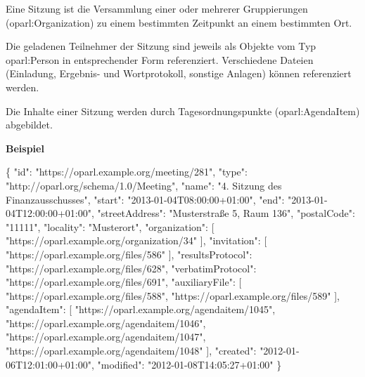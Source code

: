 \documentclass[,a4paper]{article}
\newenvironment{Shaded}{}{}
\newcommand{\DataTypeTok}[1]{\textcolor[rgb]{0.56,0.13,0.00}{{#1}}}
\newcommand{\StringTok}[1]{\textcolor[rgb]{0.25,0.44,0.63}{{#1}}}
\newcommand{\OtherTok}[1]{\textcolor[rgb]{0.00,0.44,0.13}{{#1}}}
\newcommand{\FunctionTok}[1]{\textcolor[rgb]{0.02,0.16,0.49}{{#1}}}
\begin{document}
Eine Sitzung ist die Versammlung einer oder mehrerer Gruppierungen
(oparl:Organization) zu einem bestimmten Zeitpunkt an einem bestimmten
Ort.

Die geladenen Teilnehmer der Sitzung sind jeweils als Objekte vom Typ
oparl:Person in entsprechender Form referenziert. Verschiedene Dateien
(Einladung, Ergebnis- und Wortprotokoll, sonstige Anlagen) können
referenziert werden.

Die Inhalte einer Sitzung werden durch Tagesordnungspunkte
(oparl:AgendaItem) abgebildet.

\textbf{Beispiel}

\begin{Shaded}
\begin{Highlighting}[]
\FunctionTok{\{}
    \DataTypeTok{"id"}\FunctionTok{:} \StringTok{"https://oparl.example.org/meeting/281"}\FunctionTok{,}
    \DataTypeTok{"type"}\FunctionTok{:} \StringTok{"http://oparl.org/schema/1.0/Meeting"}\FunctionTok{,}
    \DataTypeTok{"name"}\FunctionTok{:} \StringTok{"4. Sitzung des Finanzausschusses"}\FunctionTok{,}
    \DataTypeTok{"start"}\FunctionTok{:} \StringTok{"2013-01-04T08:00:00+01:00"}\FunctionTok{,}
    \DataTypeTok{"end"}\FunctionTok{:} \StringTok{"2013-01-04T12:00:00+01:00"}\FunctionTok{,}
    \DataTypeTok{"streetAddress"}\FunctionTok{:} \StringTok{"Musterstraße 5, Raum 136"}\FunctionTok{,}
    \DataTypeTok{"postalCode"}\FunctionTok{:} \StringTok{"11111"}\FunctionTok{,}
    \DataTypeTok{"locality"}\FunctionTok{:} \StringTok{"Musterort"}\FunctionTok{,}
    \DataTypeTok{"organization"}\FunctionTok{:} \OtherTok{[}
        \StringTok{"https://oparl.example.org/organization/34"}
    \OtherTok{]}\FunctionTok{,}
    \DataTypeTok{"invitation"}\FunctionTok{:} \OtherTok{[}
        \StringTok{"https://oparl.example.org/files/586"}
    \OtherTok{]}\FunctionTok{,}
    \DataTypeTok{"resultsProtocol"}\FunctionTok{:} \StringTok{"https://oparl.example.org/files/628"}\FunctionTok{,}
    \DataTypeTok{"verbatimProtocol"}\FunctionTok{:} \StringTok{"https://oparl.example.org/files/691"}\FunctionTok{,}
    \DataTypeTok{"auxiliaryFile"}\FunctionTok{:} \OtherTok{[}
        \StringTok{"https://oparl.example.org/files/588"}\OtherTok{,}
        \StringTok{"https://oparl.example.org/files/589"}
    \OtherTok{]}\FunctionTok{,}
    \DataTypeTok{"agendaItem"}\FunctionTok{:} \OtherTok{[}
        \StringTok{"https://oparl.example.org/agendaitem/1045"}\OtherTok{,}
        \StringTok{"https://oparl.example.org/agendaitem/1046"}\OtherTok{,}
        \StringTok{"https://oparl.example.org/agendaitem/1047"}\OtherTok{,}
        \StringTok{"https://oparl.example.org/agendaitem/1048"}
    \OtherTok{]}\FunctionTok{,}
    \DataTypeTok{"created"}\FunctionTok{:} \StringTok{"2012-01-06T12:01:00+01:00"}\FunctionTok{,}
    \DataTypeTok{"modified"}\FunctionTok{:} \StringTok{"2012-01-08T14:05:27+01:00"}
\FunctionTok{\}}
\end{Highlighting}
\end{Shaded}
\end{document}
